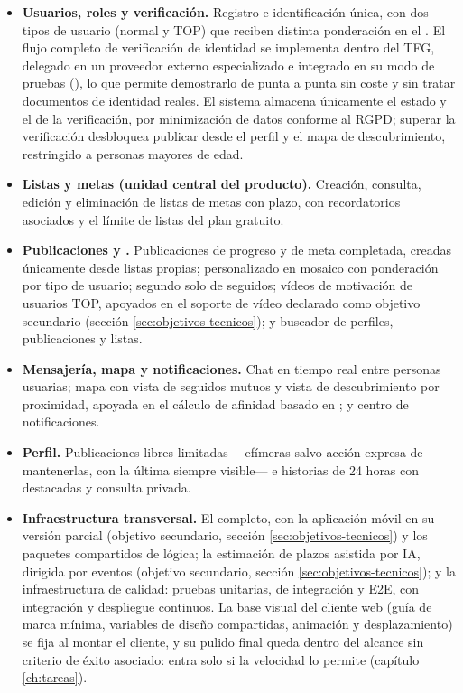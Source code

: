\begin{itemize}
  \item \textbf{Usuarios, roles y verificación.}
        Registro e identificación única, con dos tipos de usuario (normal y TOP) que reciben distinta ponderación en el .
        El flujo completo de verificación de identidad se implementa dentro del \ac{TFG}, delegado en un proveedor externo especializado e integrado en su modo de pruebas (), lo que permite demostrarlo de punta a punta sin coste y sin tratar documentos de identidad reales.
        El sistema almacena únicamente el estado y el  de la verificación, por minimización de datos conforme al \ac{RGPD}; superar la verificación desbloquea publicar desde el perfil y el mapa de descubrimiento, restringido a personas mayores de edad.
  \item \textbf{Listas y metas (unidad central del producto).}
        Creación, consulta, edición y eliminación de listas de metas con plazo, con recordatorios asociados y el límite de listas del plan gratuito.
  \item \textbf{Publicaciones y .}
        Publicaciones de progreso y de meta completada, creadas únicamente desde listas propias;  personalizado en mosaico con ponderación por tipo de usuario; segundo  solo de seguidos; vídeos de motivación de usuarios TOP, apoyados en el soporte de vídeo declarado como objetivo secundario (sección \ref{sec:objetivos-tecnicos}); y buscador de perfiles, publicaciones y listas.
  \item \textbf{Mensajería, mapa y notificaciones.}
        Chat en tiempo real entre personas usuarias; mapa con vista de seguidos mutuos y vista de descubrimiento por proximidad, apoyada en el cálculo de afinidad basado en ; y centro de notificaciones.
  \item \textbf{Perfil.}
        Publicaciones libres limitadas —efímeras salvo acción expresa de mantenerlas, con la última siempre visible— e historias de 24 horas con destacadas y consulta privada.
  \item \textbf{Infraestructura transversal.}
        El  completo, con la aplicación móvil en su versión parcial (objetivo secundario, sección \ref{sec:objetivos-tecnicos}) y los paquetes compartidos de lógica; la estimación de plazos asistida por \ac{IA}, dirigida por eventos (objetivo secundario, sección \ref{sec:objetivos-tecnicos}); y la infraestructura de calidad: pruebas unitarias, de integración y \ac{E2E}, con integración y despliegue continuos.
        La base visual del cliente web (guía de marca mínima, variables de diseño compartidas, animación y desplazamiento) se fija al montar el cliente, y su pulido final queda dentro del alcance sin criterio de éxito asociado: entra solo si la velocidad lo permite (capítulo \ref{ch:tareas}).
\end{itemize}

